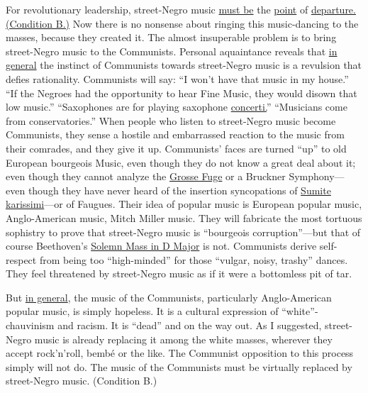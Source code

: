 For revolutionary leadership, street-Negro music \uline{must be} the 
\uline{point} of \uline{departure. (Condition B.)} Now there is no nonsense about
ringing this music-dancing to the masses, because they created
it. The almost insuperable problem is to bring street-Negro music
to the Communists. Personal aquaintance reveals that \uline{in general}
the instinct of Communists towards street-Negro music is a revulsion
that defies rationality. Communists will say: \enquote{I won't have 
that music in my house.} \enquote{If the Negroes had the opportunity to
hear Fine Music, they would disown that low music.} \enquote{Saxophones
are for playing saxophone \uline{concerti.}} \enquote{Musicians come from 
conservatories.} When people who listen to street-Negro music
become Communists, they sense a hostile and embarrassed reaction 
to the music from their comrades, and they give it up. Communists'
faces are turned \enquote{up} to old European bourgeois Music,
even though they do not know a great deal about it; even though
they cannot analyze the \uline{Grosse Fuge} or a Bruckner Symphony---even
though they have never heard of the insertion syncopations
of \uline{Sumite karissimi}---or of Faugues. Their idea of popular music
is European popular music, Anglo-American music, Mitch Miller 
music. They will fabricate the most tortuous sophistry to prove
that street-Negro music is \enquote{bourgeois corruption}---but that of
course Beethoven's \uline{Solemn Mass in D Major} is not. Communists 
derive self-respect from being too \enquote{high-minded} for those \enquote{vulgar, noisy, trashy} dances. They feel threatened by street-Negro music 
as if it were a bottomless pit of tar. 

But \uline{in general}, the music of the Communists, particularly Anglo-American
popular music, is simply hopeless. It is a cultural expression
of \enquote{white}-chauvinism and racism. It is \enquote{dead} and on
the way out. As I suggested, street-Negro music is already replacing
it among the white masses, wherever they accept rock'n'roll, 
bemb\'{e} or the like. The Communist opposition to this process 
simply will not do. The music of the Communists must be virtually 
replaced by street-Negro music. (Condition B.) 


